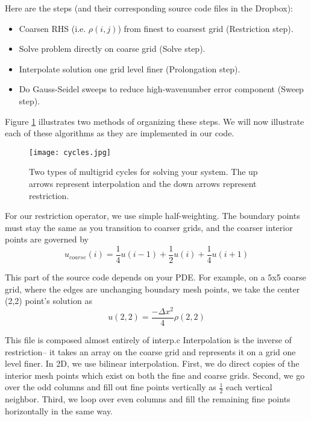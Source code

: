\documentclass[11pt]{article}
\begin{document}
Here are the steps (and their corresponding source code files in the Dropbox):

\begin{itemize}
\item Coarsen RHS (i.e. $\rho(i,j)$) from finest to coarsest grid (Restriction step). 

\item Solve problem directly on coarse grid (Solve step). 

\item Interpolate solution one grid level finer (Prolongation step). 

\item Do Gauss-Seidel sweeps to reduce high-wavenumber error component (Sweep step). 

\end{itemize}
Figure \ref{fig:cycles} illustrates two methods of organizing these steps. We will now illustrate each of these algorithms as they are implemented in our code.

\begin{figure}
\texttt{[image: cycles.jpg]}
\caption{Two types of multigrid cycles for solving your system. The up arrows represent interpolation and the down arrows represent restriction. }
\label{fig:cycles}
\end{figure}


For our restriction operator, we use simple half-weighting. The boundary points must stay the same as you transition to coarser grids, and the coarser interior points are governed by 
\begin{equation}
u_{coarse}(i) = \frac{1}{4}u(i-1) + \frac{1}{2}u(i) + \frac{1}{4}u(i+1)
\end{equation}


This part of the source code depends on your PDE.  For example, on a 5x5 coarse grid, where the edges are unchanging boundary mesh points, we take the center (2,2) point's solution as 
\begin{equation}
u(2,2) = \frac{-\Delta x^2}{4}\rho (2,2)
\end{equation}


This file is composed almost entirely of interp.c Interpolation is the inverse of restriction-- it takes an array on the coarse grid and represents it on a grid one level finer. In 2D, we use bilinear interpolation. First, we do direct copies of the interior mesh points which exist on both the fine and coarse grids. Second, we go over the odd columns and fill out fine points vertically as $\frac{1}{2}$ each vertical neighbor. Third, we loop over even columns and fill the remaining fine points horizontally in the same way. 
\end{document}
